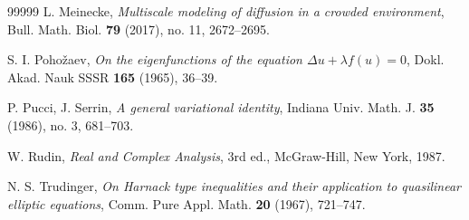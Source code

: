\documentclass[12pt,reqno]{amsart}
\begin{document}
\begin{thebibliography}{99999}
 L. Meinecke, \textit{Multiscale modeling of diffusion in a crowded environment}, Bull. Math. Biol. \textbf{79} (2017), no. 11, 2672–2695.

 S. I. Pohožaev, \textit{On the eigenfunctions of the equation \(\Delta u + \lambda f(u) = 0\)}, Dokl. Akad. Nauk SSSR \textbf{165} (1965), 36–39.

 P. Pucci, J. Serrin, \textit{A general variational identity}, Indiana Univ. Math. J. \textbf{35} (1986), no. 3, 681–703.

 W. Rudin, \textit{Real and Complex Analysis}, 3rd ed., McGraw-Hill, New York, 1987.

 N. S. Trudinger, \textit{On Harnack type inequalities and their application to quasilinear elliptic equations}, Comm. Pure Appl. Math. \textbf{20} (1967), 721–747.

\end{thebibliography}
\end{document}
